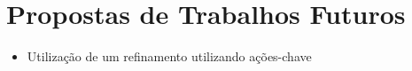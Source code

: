 	\chapter{Propostas de Trabalhos Futuros}
\begin{itemize}
	\item Utilização de um refinamento utilizando ações-chave
\end{itemize}

	\postextual
	

%
%
%
%


